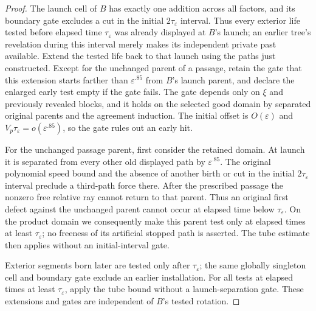 \begin{proof}
The launch cell of $B$ has exactly one addition across all factors,
and its boundary gate excludes a cut in the initial
$2\tau_\varepsilon$ interval.  Thus every exterior life tested before
elapsed time $\tau_\varepsilon$ was already displayed at $B$'s launch;
an earlier tree's revelation during this interval merely makes its
independent private past available.  Extend the tested life back to
that launch using the paths just constructed.  Except for the unchanged
parent of a passage, retain the gate that this extension starts farther
than $\varepsilon^{.85}$ from $B$'s launch parent, and declare the
enlarged early test empty if the gate fails.  The gate depends only on
$\xi$ and previously revealed blocks, and it holds on the selected
good domain by separated original parents and the agreement induction.
The initial offset is $O(\varepsilon)$ and
$V_p\tau_\varepsilon=o(\varepsilon^{.85})$, so the gate rules out an
early hit.

For the unchanged passage parent, first consider the retained domain.
At launch it is separated from every other old displayed path by
$\varepsilon^{.85}$.  The original polynomial speed bound and the
absence of another birth or cut in the initial $2\tau_\varepsilon$
interval preclude a third-path force there.  After the prescribed passage
the nonzero free relative ray cannot return to that parent.  Thus an
original first defect against the unchanged parent cannot occur at elapsed
time below $\tau_\varepsilon$.  On the product domain we consequently make
this parent test only at elapsed times at least $\tau_\varepsilon$;
no freeness of its artificial stopped path is asserted.  The tube estimate
then applies without an initial-interval gate.

Exterior segments born later
are tested only after $\tau_\varepsilon$; the same globally singleton
cell and boundary gate exclude an earlier installation.  For all tests
at elapsed times at least $\tau_\varepsilon$, apply the tube bound
without a launch-separation gate.  These extensions and gates are
independent of $B$'s tested rotation.


\end{proof}
